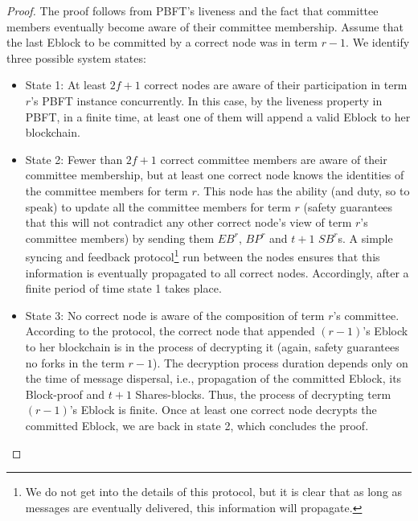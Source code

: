\begin{proof}
The proof follows from  PBFT's liveness and the fact that committee members eventually become aware of their committee membership. Assume that the last Eblock to be committed by a correct node was in term $r-1$. We identify three possible system states:
\begin{itemize}
\item State 1: At least $2f+1$ correct nodes are aware of their participation in term $r$'s PBFT instance concurrently. In this case, by the liveness property in PBFT, in a finite time, at least one of them will append a valid Eblock to her blockchain.
\item State 2: Fewer than $2f+1$ correct committee members are aware of their committee membership, but at least one correct node knows the identities of the committee members for term $r$. This node has the ability (and duty, so to speak) to update all the committee members for term $r$ (safety guarantees that this will not contradict any other correct node's view of term $r$'s committee members) by sending them $EB^r$, $BP^r$ and $t+1$ $SB^r$s. A simple syncing and feedback protocol\footnote{We do not get into the details of this protocol, but it is clear that as long as messages are eventually delivered, this information will propagate.} 
run between the nodes ensures that this information is eventually propagated to all correct nodes. Accordingly, after a finite period of time state 1 takes place.
\item State 3: No correct node is aware of the composition of term $r$'s committee. According to the protocol, the correct node that appended $(r-1)$'s Eblock to her blockchain is in the process of decrypting it (again, safety guarantees no forks in the  term $r-1$). The decryption process duration depends only on the time of message dispersal, i.e., propagation of the committed Eblock, its Block-proof and $t+1$ Shares-blocks. Thus, the process of decrypting term $(r-1)$'s Eblock is finite. Once at least one correct node decrypts the committed Eblock, we are back in state 2, which concludes the proof. \qedhere
\end{itemize}
\end{proof}


